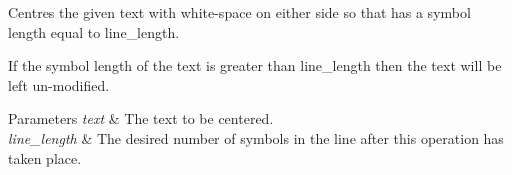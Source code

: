 Centres the given text with white-\/space on either side so that has a symbol length equal to line\-\_\-length. 

If the symbol length of the text is greater than line\-\_\-length then the text will be left un-\/modified.


\begin{DoxyParams}{Parameters}
{\em text} & The text to be centered. \\
\hline
{\em line\-\_\-length} & The desired number of symbols in the line after this operation has taken place. \\
\hline
\end{DoxyParams}
